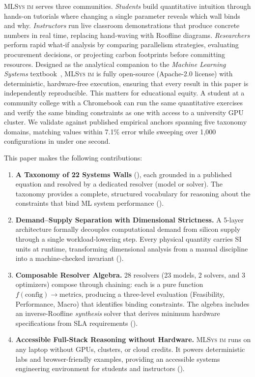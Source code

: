 \documentclass[10pt,twocolumn]{article}
\newcommand{\mlsysim}{\mbox{\textsc{MLSys}\,\textperiodcentered\,\textsc{im}}\xspace}
\begin{document}
\mlsysim serves three communities. \emph{Students} build quantitative intuition through hands-on tutorials where changing a single parameter reveals which wall binds and why. \emph{Instructors} run live classroom demonstrations that produce concrete numbers in real time, replacing hand-waving with Roofline diagrams. \emph{Researchers} perform rapid what-if analysis by comparing parallelism strategies, evaluating procurement decisions, or projecting carbon footprints before committing resources. Designed as the analytical companion to the \emph{Machine Learning Systems} textbook~\citep{mlsysbook2025}, \mlsysim is fully open-source (Apache-2.0 license) with deterministic, hardware-free execution, ensuring that every result in this paper is independently reproducible. This matters for educational equity. A student at a community college with a Chromebook can run the same quantitative exercises and verify the same binding constraints as one with access to a university GPU cluster. We validate against published empirical anchors spanning five taxonomy domains, matching values within 7.1\% error while sweeping over 1{,}000 configurations in under one second.

This paper makes the following contributions:

\begin{enumerate}[leftmargin=*,itemsep=3pt,label=\textbf{C\arabic*.}]
    \item \textbf{A Taxonomy of 22 Systems Walls} (), each grounded in a published equation and resolved by a dedicated resolver (model or solver). The taxonomy provides a complete, structured vocabulary for reasoning about the constraints that bind ML system performance ().

    \item \textbf{Demand--Supply Separation with Dimensional Strictness.} A 5-layer architecture formally decouples computational demand from silicon supply through a single workload-lowering step. Every physical quantity carries SI units at runtime, transforming dimensional analysis from a manual discipline into a machine-checked invariant ().

    \item \textbf{Composable Resolver Algebra.} 28 resolvers (23 models, 2 solvers, and 3 optimizers) compose through chaining: each is a pure function $f(\text{config}) \to \text{metrics}$, producing a three-level evaluation (Feasibility, Performance, Macro) that identifies binding constraints. The algebra includes an inverse-Roofline \emph{synthesis} solver that derives minimum hardware specifications from SLA requirements ().

    \item \textbf{Accessible Full-Stack Reasoning without Hardware.} \mlsysim runs on any laptop without GPUs, clusters, or cloud credits. It powers deterministic labs and browser-friendly examples, providing an accessible systems engineering environment for students and instructors ().
\end{enumerate}
\end{document}
